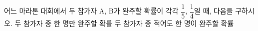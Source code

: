어느 마라톤 대회에서 두 참가자 A, B가 완주할 확률이 각각 $\dfrac{1}{5}$, $\dfrac{1}{4}$일 때, 다음을 구하시오.
 두 참가자 중 한 명만 완주할 확률
 두 참가자 중 적어도 한 명이 완주할 확률
